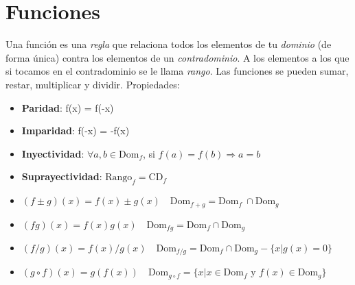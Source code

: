 \documentclass[pdftex,11pt,a4paper]{article}
\begin{document}
\section{Funciones}
Una función es una \textit{regla} que relaciona todos los elementos de tu \textit{dominio} (de forma única) contra los elementos de un \textit{contradominio}. A los elementos a los que si tocamos en el contradominio se le llama \textit{rango}. Las funciones se pueden sumar, restar, multiplicar y dividir. Propiedades:

\begin{itemize}
	\item \textbf{Paridad}: f(x) = f(-x)
	\item \textbf{Imparidad}: f(-x) = -f(x)
	\item \textbf{Inyectividad}: $\forall a,b \in \text{Dom}_f$, si $f(a) = f(b) \Rightarrow a = b$
	\item \textbf{Suprayectividad}: $\text{Rango}_f = \text{CD}_f$
	\item $(f\pm g)(x) = f(x) \pm g(x) \quad \text{Dom}_{f+g} = \text{Dom}_f \ \cap \text{Dom}_g$ 
	\item $(fg)(x) = f(x)g(x) \quad \text{Dom}_{fg} = \text{Dom}_f \cap \text{Dom}_g$
	\item $(f/g)(x) = f(x)/g(x) \quad \text{Dom}_{f/g} = \text{Dom}_f \cap \text{Dom}_g - \{x|g(x) = 0\}$
	\item $(g\circ f)(x) = g(f(x)) \quad \text{Dom}_{g\circ f} = \{x|x\in \text{Dom}_f \text{ y } f(x) \in \text{Dom}_g\}$
\end{itemize}
\end{document}
